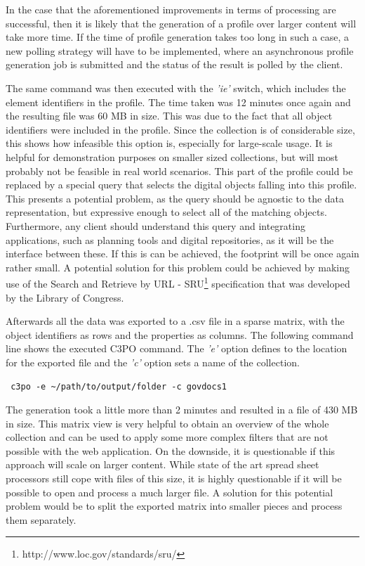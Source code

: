 In the case that the aforementioned improvements in terms of processing are successful, then it is likely that the generation of a profile over larger content will take more time.
If the time of profile generation takes too long in such a case, a new polling strategy will have to be implemented, where an asynchronous profile generation job is submitted and the status of the result is polled by the client.

The same command was then executed with the \textit{'ie'} switch, which includes the element identifiers in the profile.
The time taken was 12 minutes once again and the resulting file was 60 MB in size.
This was due to the fact that all object identifiers were included in the profile.
Since the collection is of considerable size, this shows how infeasible this option is, especially for large-scale usage.
It is helpful for demonstration purposes on smaller sized collections, but will most probably not be feasible in real world scenarios.
This part of the profile could be replaced by a special query that selects the digital objects falling into this profile.
This presents a potential problem, as the query should be agnostic to the data representation, but expressive enough to select all of the matching objects.
Furthermore, any client should understand this query and integrating applications, such as planning tools and digital repositories, as it will be the interface between these.
If this is can be achieved, the footprint will be once again rather small. A potential solution for this problem could be achieved by making use of the Search and Retrieve by URL - SRU\footnote{http://www.loc.gov/standards/sru/} specification that was developed by the Library of Congress.


Afterwards all the data was exported to a .csv file in a sparse matrix, with the object identifiers as rows and the properties as columns.
The following command line shows the executed C3PO command. The \textit{'e'} option defines to the location for the exported file and the \textit{'c'} option sets a name of the collection.

\begin{verbatim}
 c3po -e ~/path/to/output/folder -c govdocs1
\end{verbatim}

The generation took a little more than 2 minutes and resulted in a file of 430 MB in size.
This matrix view is very helpful to obtain an overview of the whole collection and can be used to apply some more complex filters that are not possible with the web application.
On the downside, it is questionable if this approach will scale on larger content.
While state of the art spread sheet processors still cope with files of this size, it is highly questionable if it will be possible to open and process a much larger file.
A solution for this potential problem would be to split the exported matrix into smaller pieces and process them separately.

